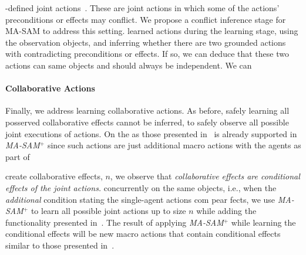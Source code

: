 \documentclass[letterpaper]{article} %
\theoremstyle{definition}
\theoremstyle{remark}
\newcommand{\masam}{\ac{MA-SAM}\xspace}
\newcommand{\cmasam}{\textit{MA-SAM\ensuremath{^+}}\xspace}
\begin{document}
-defined joint actions~\cite{boutilier2001partial}.
These are joint actions in which some of the actions' preconditions or effects may conflict. We propose a conflict inference stage for \masam to address this setting.  learned actions during the learning stage, using the observation objects, and inferring whether there are two grounded actions with contradicting preconditions or effects. If so, we can deduce that these two actions can same objects and should always be independent. We can    

\paragraph{Collaborative Actions}

Finally, we address learning collaborative actions. As before, safely learning all posserved collaborative effects cannot be inferred, to safely  observe all possible joint executions of actions.
On the  as those presented in~\cite{shekhar2020representing} is already supported in \cmasam since such actions are just additional macro actions with the agents as part of 

  create collaborative effects, $n$, we observe that \textit{collaborative effects are conditional effects of the joint actions.}  concurrently on the same objects, i.e., when the \textit{additional} condition stating the single-agent actions com pear fects, we use \cmasam to learn all possible joint actions up to size $n$ while adding the functionality presented in~\cite{mordoch2023safe}. The result of applying \cmasam while learning the conditional effects will be new macro actions that contain conditional effects similar to those presented in~\cite{hofmann2020macro}.
\end{document}
